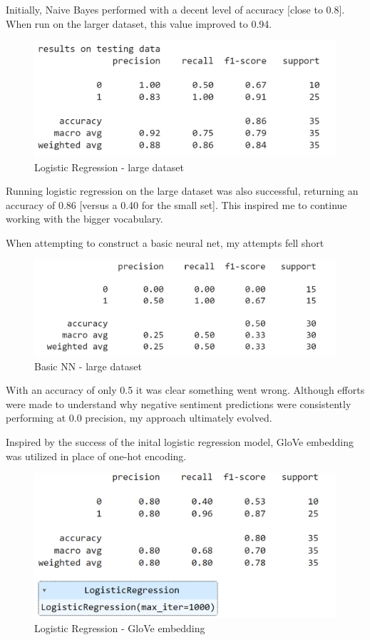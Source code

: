 \documentclass[11pt,a4paper]{article}
\begin{document}
Initially, Naive Bayes performed with a decent level of accuracy [close to 0.8]. When run on the larger dataset, this value improved to 0.94.

\begin{figure}[h]
    \centering
    \includegraphics[width=0.75\linewidth]{log_regression_large.png}
    \caption{Logistic Regression - large dataset}
\end{figure}

Running logistic regression on the large dataset was also successful, returning an accuracy of 0.86 [versus a 0.40 for the small set]. This inspired me to continue working with the bigger vocabulary.

When attempting to construct a basic neural net, my attempts fell short

\begin{figure}[h]
    \centering
    \includegraphics[width=0.75\linewidth]{nn_attempt.png}
    \caption{Basic NN - large dataset}
\end{figure}

With an accuracy of only 0.5 it was clear something went wrong. Although efforts were made to understand why negative sentiment predictions were consistently performing at 0.0 precision, my approach ultimately evolved.

Inspired by the success of the inital logistic regression model, GloVe embedding was utilized in place of one-hot encoding.

\begin{figure}[h]
    \centering
    \includegraphics[width=0.75\linewidth]{lr_glove.png}
    \caption{Logistic Regression - GloVe embedding}
\end{figure}
\end{document}
